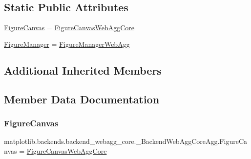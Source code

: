 \subsection*{Static Public Attributes}
\begin{DoxyCompactItemize}
\item 
\hyperlink{classmatplotlib_1_1backends_1_1backend__webagg__core_1_1__BackendWebAggCoreAgg_a3066a54d3a5e5112a9269259e92892cc}{Figure\+Canvas} = \hyperlink{classmatplotlib_1_1backends_1_1backend__webagg__core_1_1FigureCanvasWebAggCore}{Figure\+Canvas\+Web\+Agg\+Core}
\item 
\hyperlink{classmatplotlib_1_1backends_1_1backend__webagg__core_1_1__BackendWebAggCoreAgg_a18d85626a329c7906e2455410fe69dd1}{Figure\+Manager} = \hyperlink{classmatplotlib_1_1backends_1_1backend__webagg__core_1_1FigureManagerWebAgg}{Figure\+Manager\+Web\+Agg}
\end{DoxyCompactItemize}
\subsection*{Additional Inherited Members}


\subsection{Member Data Documentation}
\mbox{\label{classmatplotlib_1_1backends_1_1backend__webagg__core_1_1__BackendWebAggCoreAgg_a3066a54d3a5e5112a9269259e92892cc}} 
\subsubsection{\texorpdfstring{Figure\+Canvas}{FigureCanvas}}
{\footnotesize\ttfamily matplotlib.\+backends.\+backend\+\_\+webagg\+\_\+core.\+\_\+\+Backend\+Web\+Agg\+Core\+Agg.\+Figure\+Canvas = \hyperlink{classmatplotlib_1_1backends_1_1backend__webagg__core_1_1FigureCanvasWebAggCore}{Figure\+Canvas\+Web\+Agg\+Core}\hspace{0.3cm}{\ttfamily [static]}}

